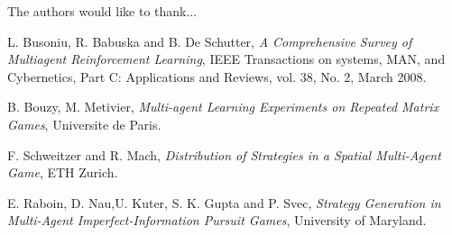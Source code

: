 \documentclass[conference]{IEEEtran}
\begin{document}
The authors would like to thank...




\begin{thebibliography}{1}

L. Busoniu, R. Babuska and B. De Schutter, \emph{A Comprehensive Survey of Multiagent Reinforcement Learning}, IEEE Transactions on systems, MAN, and Cybernetics, Part C: Applications and Reviews, vol. 38, No. 2, March 2008.

B. Bouzy, M. Metivier, \emph{Multi-agent Learning Experiments on Repeated Matrix Games}, Universite de Paris.

F. Schweitzer and R. Mach, \emph{Distribution of Strategies in a Spatial Multi-Agent Game}, ETH Zurich.

E. Raboin, D. Nau,U. Kuter, S. K. Gupta and P. Svec, \emph{Strategy Generation in Multi-Agent Imperfect-Information
Pursuit Games}, University of Maryland.


\end{thebibliography}
\end{document}
